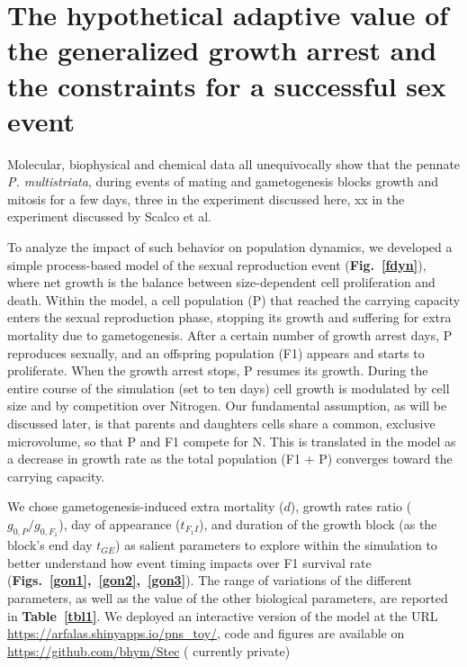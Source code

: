 \documentclass[a4paper,oneside]{book}
\begin{document}
  \section*{The hypothetical adaptive value of the generalized growth arrest and the constraints for a successful sex event}
    Molecular, biophysical and chemical data all unequivocally show that the pennate \textit{P. multistriata}, during events of mating and gametogenesis blocks growth and mitosis for a few days, three in the experiment discussed here, xx in the experiment discussed by Scalco et al.

    To analyze the impact of such behavior on population dynamics, we developed a simple process-based model of the sexual reproduction event (\textbf{Fig.~\ref{fdyn}}), where net growth is the balance between size-dependent cell proliferation and death.
    Within the model, a cell population (P) that reached the carrying capacity enters the sexual reproduction phase, stopping its growth and suffering for extra mortality due to gametogenesis.
    After a certain number of growth arrest days, P reproduces sexually, and an offspring population (F1) appears and starts to proliferate.
    When the growth arrest stops, P resumes its growth.
    During the entire course of the simulation (set to ten days) cell growth is modulated by cell size and by competition over Nitrogen.
    Our fundamental assumption, as will be discussed later, is that parents and daughters cells share a common, exclusive microvolume, so that P and F1 compete for N. This is translated in the model as a decrease in growth rate as the total population (F1 + P) converges toward the carrying capacity.

    We chose gametogenesis-induced extra mortality ($d$), growth rates ratio ($g_{0,P}/g_{0,F_{1}}$), day of appearance ($t_{F_{1}I}$), and duration of the growth block (as the block's end day $t_{GE}$) as salient parameters to explore within the simulation to better understand how event timing impacts over F1 survival rate (\textbf{Figs.~\ref{gon1},~\ref{gon2},~\ref{gon3}}).
    The range of variations of the different parameters, as well as the value of the other biological parameters, are reported in \textbf{Table~\ref{tbl1}}.
    We deployed an interactive version of the model at the URL \url{https://arfalas.shinyapps.io/pns_toy/}, code and figures are available on \url{https://github.com/bhym/Stec} ({\color{red} currently private})
\end{document}
